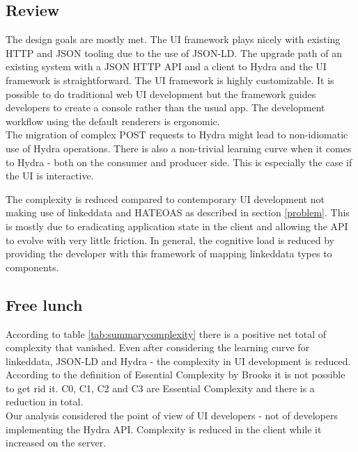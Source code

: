 \subsection{Review}
The design goals are mostly met. The UI framework plays nicely with existing HTTP and JSON tooling due to the use of JSON-LD. The upgrade path of an existing system with a JSON HTTP API and a client to Hydra and the UI framework is straightforward. The UI framework is highly customizable. It is possible to do traditional web UI development but the framework guides developers to create a \gls{console} rather than the usual app. The development workflow using the default renderers is ergonomic. \\
The migration of complex POST requests to Hydra might lead to non-idiomatic use of Hydra operations. There is also a non-trivial learning curve when it comes to Hydra - both on the consumer and producer side. This is especially the case if the UI is interactive.

The complexity is reduced compared to contemporary UI development not making use of \gls{linkeddata} and HATEOAS as described in section \ref{problem}. This is mostly due to eradicating application state in the client and allowing the API to evolve with very little friction. In general, the \gls{cognitive load} is reduced by providing the developer with this framework of mapping \gls{linkeddata} types to components.

\subsection{Free lunch}
According to table \ref{tab:summarycomplexity} there is a positive net total of complexity that vanished. Even after considering the learning curve for \gls{linkeddata}, JSON-LD and Hydra - the complexity in UI development is reduced. \\
According to the definition of Essential Complexity by Brooks it is not possible to get rid it. C0, C1, C2 and C3 are Essential Complexity and there is a reduction in total. \\
Our analysis considered the point of view of UI developers - not of developers implementing the Hydra API. Complexity is reduced in the client while it increased on the server.

